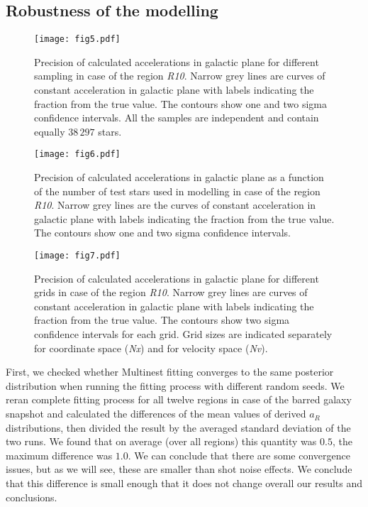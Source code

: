 \documentclass[fleqn,usenatbib]{mnras}
\begin{document}
\subsection{Robustness of the modelling}
\begin{figure}
	\texttt{[image: fig5.pdf]}
	\caption{Precision of calculated accelerations in galactic plane for different sampling in case of the region \textit{R10}. Narrow grey lines are curves of constant acceleration in galactic plane with labels indicating the fraction from the true value. The contours show one and two sigma confidence intervals. All the samples are independent and contain equally $38\,297$ stars. }\label{fig:shotnoise}
\end{figure}   
\begin{figure}
	\texttt{[image: fig6.pdf]}
	\caption{Precision of calculated accelerations in galactic plane as a function of the number of test stars used in modelling in case of the region \textit{R10}. Narrow grey lines are the curves of constant acceleration in galactic plane with labels indicating the fraction from the true value. The contours show one and two sigma confidence intervals. }\label{fig:nstar}
\end{figure}
\begin{figure}
	\texttt{[image: fig7.pdf]}
	\caption{Precision of calculated accelerations in galactic plane for different grids in case of the region \textit{R10}. Narrow grey lines are curves of constant acceleration in galactic plane with labels indicating the fraction from the true value. The contours show two sigma confidence intervals for each grid. Grid sizes are indicated separately for coordinate space (\textit{Nx}) and for velocity space (\textit{Nv}). }\label{fig:ngrid}
\end{figure}
First, we checked whether Multinest fitting converges to the same posterior distribution when running the fitting process with different random seeds. We reran complete fitting process for all twelve regions in case of the barred galaxy snapshot and calculated the differences of the mean values of derived $a_R$ distributions, then divided the result by the averaged standard deviation of the two runs. We found that on average (over all regions) this quantity was $0.5$, the maximum difference was $1.0$. We can conclude that there are some convergence issues, but as we will see, these are smaller than shot noise effects. We conclude that this difference is small enough that it does not change overall our results and conclusions. 
\end{document}
